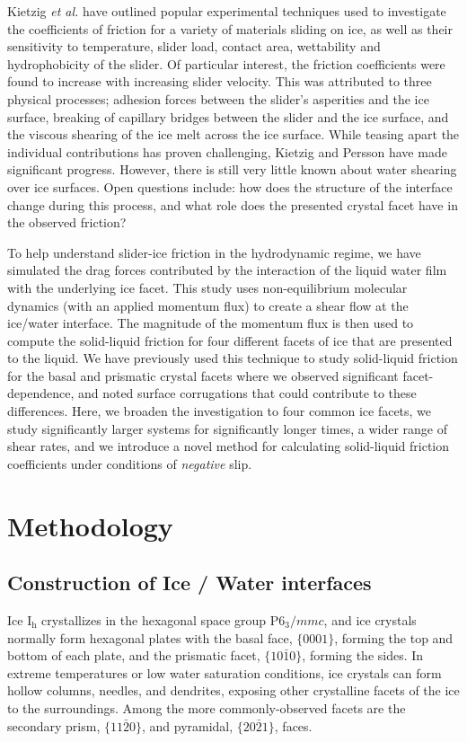 Kietzig \textit{et al.} have outlined popular experimental techniques
used to investigate the coefficients of friction for a variety of
materials sliding on ice, as well as their sensitivity to temperature,
slider load, contact area, wettability and hydrophobicity of the
slider.\cite{Kietzig2010} Of particular interest, the friction
coefficients were found to increase with increasing slider
velocity. This was attributed to three physical processes; adhesion
forces between the slider's asperities and the ice surface, breaking
of capillary bridges between the slider and the ice surface, and the
viscous shearing of the ice melt across the ice surface. While teasing
apart the individual contributions has proven challenging,
Kietzig\cite{Kietzig2009} and Persson\cite{Persson2015,Tuononen2016}
have made significant progress. However, there is still very little
known about water shearing over ice surfaces. Open questions include:
how does the structure of the interface change during this process,
and what role does the presented crystal facet have in the observed
friction?

To help understand slider-ice friction in the hydrodynamic regime, we
have simulated the drag forces contributed by the interaction of the
liquid water film with the underlying ice facet. This study uses
non-equilibrium molecular dynamics (with an applied momentum flux) to
create a shear flow at the ice/water interface. The magnitude of the
momentum flux is then used to compute the solid-liquid friction for
four different facets of ice that are presented to the liquid.  We
have previously used this technique to study solid-liquid friction for
the basal and prismatic crystal facets where we observed significant
facet-dependence, and noted surface corrugations that could contribute
to these differences.\cite{Louden2013} Here, we broaden the
investigation to four common ice facets, we study significantly larger
systems for significantly longer times, a wider range of shear rates,
and we introduce a novel method for calculating solid-liquid friction
coefficients under conditions of \textit{negative} slip.

\section{Methodology}
\subsection{Construction of Ice / Water interfaces}
Ice I$_\mathrm{h}$ crystallizes in the hexagonal space group
P$6_3/mmc$, and ice crystals normally form hexagonal plates with the
basal face, $\{0001\}$, forming the top and bottom of each plate, and
the prismatic facet, $\{10\bar{1}0\}$, forming the sides.  In extreme
temperatures or low water saturation conditions, ice crystals can form
hollow columns, needles, and dendrites, exposing other crystalline
facets of the ice to the surroundings.  Among the more
commonly-observed facets are the secondary prism, $\{11\bar{2}0\}$,
and pyramidal, $\{20\bar{2}1\}$, faces.

